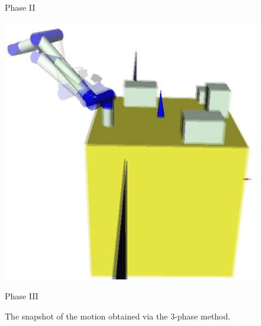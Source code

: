 \begin{figure}[t]
\begin{minipage}[h]{0.3\linewidth}
    \footnotesize\par{Phase II}
  \end{minipage}
  \begin{minipage}[h]{0.3\linewidth}
    \centering
    \includegraphics[width=1.0\linewidth]{fig/chapter4/PTP/phase3.eps}
    \footnotesize\par{Phase III}
  \end{minipage}
  \caption{The snapshot of the motion obtained via the 3-phase method.}
  \label{fig:SNAP_3PHASE}
\end{figure}
%

